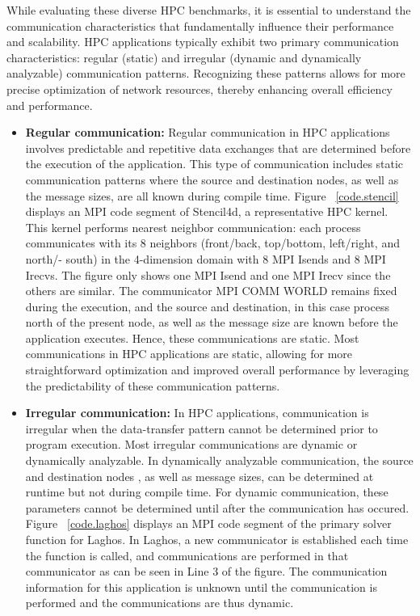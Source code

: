 While evaluating these diverse HPC benchmarks, it is essential to understand the communication characteristics that fundamentally influence their performance and scalability. HPC applications typically exhibit two primary communication characteristics: regular (static) and irregular (dynamic and dynamically analyzable) communication patterns. Recognizing these patterns allows for more precise optimization of network resources, thereby enhancing overall efficiency and performance.

\begin{itemize}
\item \textbf{Regular communication:} Regular communication in HPC applications involves predictable and repetitive data exchanges that are determined before the execution of the application. This type of communication includes static communication patterns where the source and destination nodes, as well as the message sizes, are all known during compile time. Figure ~\ref{code.stencil} displays an MPI code segment of Stencil4d, a representative HPC kernel.
This kernel performs nearest neighbor communication: each process communicates with its 8 neighbors (front/back, top/bottom, left/right, and north/- south) in the 4-dimension domain with 8 MPI Isends and 8 MPI Irecvs. The figure only shows one MPI Isend and one MPI Irecv since the others are similar. The communicator MPI COMM WORLD remains fixed during the execution, and the source and destination, in this case process north of the present node, as well as the message size are known before the application executes. Hence, these communications are static. 
Most communications in HPC applications are static, allowing for more straightforward optimization and improved overall performance by leveraging the predictability of these communication patterns.

\item \textbf{Irregular communication:} 
In HPC applications, communication is irregular when the data-transfer pattern cannot be determined prior to program execution. Most irregular communications are dynamic or dynamically analyzable.
In dynamically analyzable communication, the source and destination nodes
, as well as message sizes, can be determined at runtime but not 
during compile time. For dynamic communication, these parameters cannot be determined 
until after the communication has occured. Figure ~\ref{code.laghos} displays an MPI code segment of the primary solver function for Laghos. In Laghos, a new communicator is established each time the function is called, and communications are performed in that communicator as can be seen in Line 3 of the figure. The communication information for this application is unknown until the communication is performed and the communications are thus dynamic.

\end{itemize}

